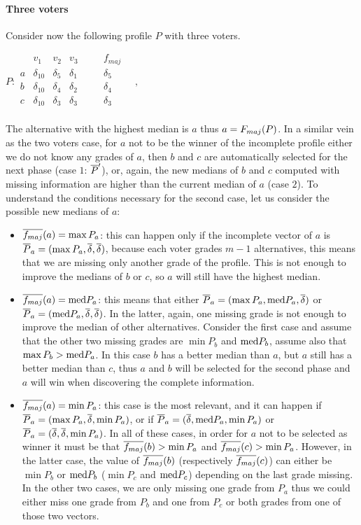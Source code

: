 \documentclass[version=3.21, pagesize, twoside=off, bibliography=totoc, DIV=calc, fontsize=12pt, a4paper]{scrartcl}
\begin{document}
\paragraph{Three voters}
Consider now the following profile $P$ with three voters.
\begin{center}
	$P:
	\begin{array}{cccccc}
		& v_1 & v_2 &v_3 & \quad & f_{maj} \\
		a &	\delta_{10} & \delta_5 & \delta_1 & \quad& \delta_5 \\
		b &	\delta_{10} & \delta_4 & \delta_2 &\quad& \delta_4 \\
		c &	\delta_{10} & \delta_3 & \delta_3 &\quad& \delta_3 \\
	\end{array} \quad, \qquad
	$
\end{center}
The alternative with the highest median is $a$ thus $a=F_{maj}(P)$. In a similar vein as the two voters case, for $a$ not to be the winner of the incomplete profile either we do not know any grades of $a$, then $b$ and $c$ are automatically selected for the next phase (case $1$: $\overline{P}'$), or, again, the new medians of $b$ and $c$ computed with missing information are higher than the current median of $a$ (case $2$). 
To understand the conditions necessary for the second case, let us consider the possible new medians of $a$:
\begin{itemize}
	\item $\overline{f_{maj}}(a)= \max{P_a}$: this can happen only if the incomplete vector of $a$ is $\overline{P}_a=(\max{P_a},\overline{\delta},\overline{\delta})$, because each voter grades $m-1$ alternatives, this means that we are missing only another grade of the profile. This is not enough to improve the medians of $b$ or $c$, so $a$ will still have the highest median.
	\item $\overline{f_{maj}}(a)= \text{med}{P_a}$: this means that either $\overline{P}_a=(\max{P_a},\text{med}{P_a},\overline{\delta})$ or $\overline{P}_a=(\text{med}{P_a},\overline{\delta},\overline{\delta})$. In the latter, again, one missing grade is not enough to improve the median of other alternatives. Consider the first case and assume that the other two missing grades are $\min{P_b}$ and $\text{med}{P_b}$, assume also that $\max{P_b}>\text{med}{P_a}$. In this case $b$ has a better median than $a$, but $a$ still has a better median than $c$, thus $a$ and $b$ will be selected for the second phase and $a$ will win when discovering the complete information.
	\item $\overline{f_{maj}}(a)= \min{P_a}$: this case is the most relevant, and it can happen if $\overline{P}_a=(\max{P_a},\overline{\delta},\min{P_a})$, or if $\overline{P}_a=(\overline{\delta},\text{med}{P_a},\min{P_a})$ or $\overline{P}_a=(\overline{\delta},\overline{\delta},\min{P_a})$. In all of these cases, in order for $a$ not to be selected as winner it must be that $\overline{f_{maj}}(b)>\min{P_a}$ and  $\overline{f_{maj}}(c)>\min{P_a}$. However, in the latter case, the value of $\overline{f_{maj}}(b)$ (respectively $\overline{f_{maj}}(c)$) can either be $\min{P_b}$ or $\text{med}{P_b}$ ($\min{P_c}$ and $\text{med}{P_c}$) depending on the last grade missing. In the other two cases, we are only missing one grade from $P_a$ thus we could either miss one grade from $P_b$ and one from $P_c$ or both grades from one of those two vectors.
\end{itemize}
\end{document}
